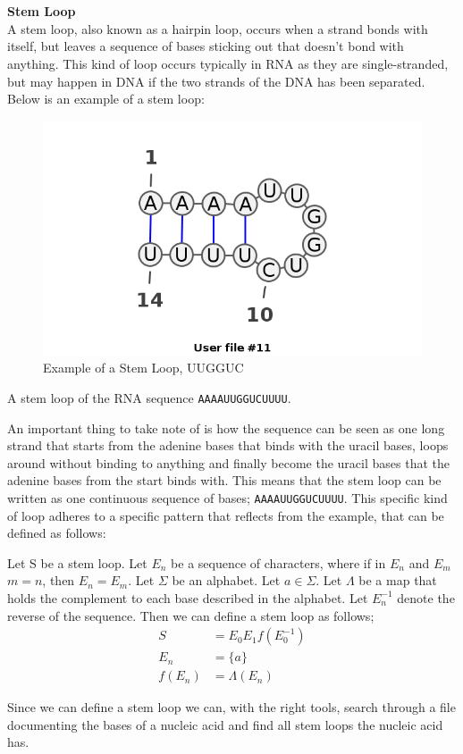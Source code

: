 \\\\
\textbf{Stem Loop}\\
A stem loop, also known as a hairpin loop, occurs when a strand bonds with 
itself, but leaves a sequence of bases sticking out that doesn't bond with anything. 
This kind of loop occurs typically in RNA as they are single-stranded, but may 
happen in DNA if the two strands of the DNA has been separated. Below is an 
example of a stem loop:
\begin{myex}\centering
\begin{figure}[h!]
\centering
\includegraphics[scale=0.5]{./lib/stem-loop.png}
\caption{Example of a Stem Loop, UUGGUC}
\end{figure}
A stem loop of the RNA sequence {\tt AAAAUUGGUCUUUU}.
\end{myex}
An important thing to take note of is how the sequence can be seen as one 
long strand that starts from the adenine bases that binds with the uracil bases, 
loops around without binding to anything and finally become the uracil bases 
that the adenine bases from the start binds with. This means that the 
stem loop can be written as one continuous sequence of bases; {\tt AAAAUUGGUCUUUU}. 
This specific kind of loop adheres to a specific pattern that reflects from 
the example, that can be defined as follows:
\begin{mydef}
\centering
Let S be a stem loop. Let $E_n$ be a sequence of characters, where if in $E_n$ 
and $E_m$ $m = n$, then $E_n =E_m$. Let $\Sigma$ be an alphabet. Let 
$a \in \Sigma$. Let $\Lambda$ be a map that holds the complement to each base 
described in the alphabet. Let $E_n^{-1}$
denote the reverse of the sequence. Then we can define a stem loop as follows;
\begin{align*}
S      &= E_0 E_1 f(E_0^{-1}) \\
E_n    &= \{a\}\\
f(E_n) &= \Lambda(E_n)
\end{align*}
\end{mydef}
Since we can define a stem loop we can, with the right tools, search through 
a file documenting the bases of a nucleic acid and find all stem loops 
the nucleic acid has.

